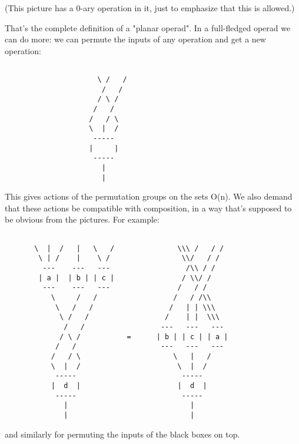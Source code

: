 (This picture has a 0-ary operation in it, just to emphasize
that this is allowed.)  

That's the complete definition of a "planar operad".  In a 
full-fledged operad we can do more: we can permute the inputs 
of any operation and get a new operation:
                      

\begin{verbatim}

                      \ /   /
                       /   /
                      / \ /    
                     /   /   
                    /   / \
                    \  |  /
                     -----
                    |     | 
                     -----
                       |
                       |
\end{verbatim}
    
This gives actions of the permutation groups on the sets O(n).  
We also demand that these actions be compatible with composition, 
in a way that's supposed to be obvious from the pictures.   For 
example:



\begin{verbatim}

       \  |  /   |   \   /               \\\ /   / /
        \ | /    |    \ /                 \\/   / /
         ---    ---   ---                  /\\ / /
        | a |  | b | | c |                / \\/ /
         ---    ---   ---                /   / /
           \     /   /                  /   / /\\
            \   /   /                  /   | | \\\  
             \ /   /                  /    | |  \\\
              /   /                  ---   ---   ---
             / \ /           =      | b | | c | | a |
            /   /                    ---   ---   ---
           /   / \                      \   |   /
           \  |  /                       \  |  /
            -----                         -----
           |  d  |                       |  d  | 
            -----                         -----
              |                             |
              |                             |
\end{verbatim}
    
and similarly for permuting the inputs of the black boxes on
top.

